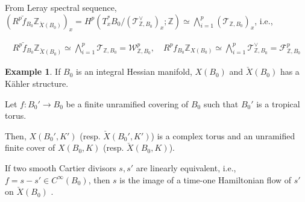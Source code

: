 \documentclass[a4paper,dvipdfmx,reqno,12pt]{amsart}
\theoremstyle{definition}
\newtheorem{Eg}[Thm]{Example}
\newcommand{\Z}{\mathbb{Z}}%
\newcommand{\mcal}[1]{\mathcal{#1}}%
\newcommand{\TBZ}{\mcal{T}_{\Z,B_0}}
\numberwithin{equation}{section}
\begin{document}
From Leray spectral sequence, $(R^{p}\check{f}_{B_0}\Z_{\check{X}(B_0)})_{x}=H^{p}(T^{*}_xB_0/(\TBZ^{\vee})_x;\Z)\simeq \bigwedge_{i=1}^{p}(\TBZ)_{x}$, i.e.,

\begin{align}
  R^{p}\check{f}_{B_0}\Z_{\check{X}(B_0)}\simeq \bigwedge_{i=1}^{p} \TBZ=\mcal{W}^{p}_{\Z,B_0}, \quad R^{p}f_{B_0}\Z_{X(B_0)}\simeq \bigwedge_{i=1}^{p} \TBZ^{\vee}=\mcal{F}_{\Z,B_0}^{p}
\end{align}

\begin{Eg}
If $B_0$ is an integral Hessian manifold, 
$X(B_0)$ and $\check{X}(B_0)$ has a K\"ahler structure.

Let $f:B_0' \to B_0$ be a finite unramified covering of $B_0$ such that $B_0'$ is a tropical torus.

Then, $X(B_0',K')$ (resp. $\check{X}(B_0',K')$) 
is a complex torus and an unramified finite cover 
of $X(B_0,K)$ (resp. $\check{X}(B_0,K)$).

\end{Eg}
If two smooth Cartier divisors $s,s'$ are linearly equivalent, 
i.e., $f=s-s'\in C^{\infty}(B_0)$, 
then $s$ is the image of a time-one Hamiltonian flow of $s'$
on $\check{X}(B_0)$
\cite[Exercise 6.65]{aspinwallDirichletBranesMirror2009}.




\printindex
\end{document}
